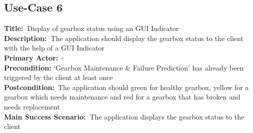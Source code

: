 \subsection{Use-Case 6}
\textbf{Title: }Display of gearbox status using an GUI Indicator\\
\textbf{Description: }The application should display the gearbox status to the client with the help of a GUI Indicator\\
\textbf{Primary Actor:} -\\
\textbf{Precondition:} ‘Gearbox Maintenance \& Failure Prediction’ has already been triggered by the client at least once\\
\textbf{Postcondition:} The application should green for healthy gearbox, yellow for a gearbox which needs maintenance and red for a gearbox that has broken and needs replacement\\
\textbf{Main Success Scenario: }The application displays the gearbox status to the client\\